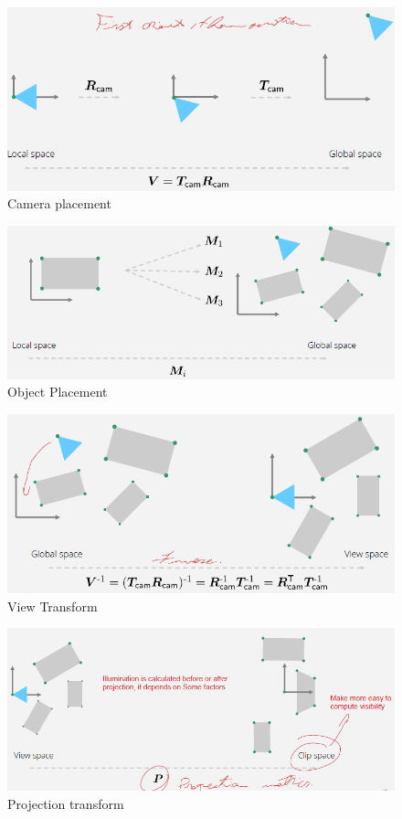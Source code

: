 \documentclass{article}
\begin{document}
\begin{figure}[h!]
\includegraphics[scale=0.6]{image48.png}
\caption{Camera placement}
\end{figure}
\begin{figure}[h!]
\includegraphics[scale=0.6]{image49.png}
\caption{Object Placement}
\end{figure}
\begin{figure}[h!]
\includegraphics[scale=0.6]{image50.png}
\caption{View Transform}
\end{figure}
\begin{figure}[h!]
\includegraphics[scale=0.6]{image51.png}
\caption{Projection transform}
\end{figure}
\end{document}
